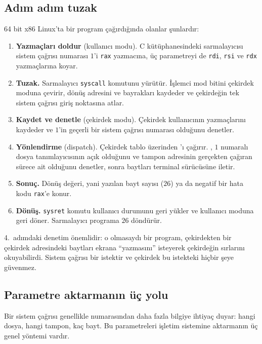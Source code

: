 \subsection{Adım adım tuzak}

64 bit x86 Linux'ta bir program  çağırdığında olanlar şunlardır:

\begin{enumerate}[leftmargin=1.4em]
  \item \textbf{Yazmaçları doldur} (kullanıcı modu). C kütüphanesindeki  sarmalayıcısı sistem çağrısı numarası $1$'i \texttt{rax} yazmacına, üç parametreyi de \texttt{rdi}, \texttt{rsi} ve \texttt{rdx} yazmaçlarına koyar.
  \item \textbf{Tuzak.} Sarmalayıcı \texttt{syscall} komutunu yürütür. İşlemci mod bitini çekirdek moduna çevirir, dönüş adresini ve bayrakları kaydeder ve çekirdeğin tek sistem çağrısı giriş noktasına atlar.
  \item \textbf{Kaydet ve denetle} (çekirdek modu). Çekirdek kullanıcının yazmaçlarını kaydeder ve $1$'in geçerli bir sistem çağrısı numarası olduğunu denetler.
  \item \textbf{Yönlendirme} (dispatch). Çekirdek tablo üzerinden 'ı çağırır. , $1$ numaralı dosya tanımlayıcısının açık olduğunu ve tampon adresinin gerçekten çağıran sürece ait olduğunu denetler, sonra baytları terminal sürücüsüne iletir.
  \item \textbf{Sonuç.} Dönüş değeri, yani yazılan bayt sayısı ($26$) ya da negatif bir hata kodu \texttt{rax}'e konur.
  \item \textbf{Dönüş.} \texttt{sysret} komutu kullanıcı durumunu geri yükler ve kullanıcı moduna geri döner. Sarmalayıcı programa $26$ döndürür.
\end{enumerate}

4.~adımdaki denetim önemlidir: o olmasaydı bir program, çekirdekten bir çekirdek adresindeki baytları ekrana ``yazmasını'' isteyerek çekirdeğin sırlarını okuyabilirdi. Sistem çağrısı bir istektir ve çekirdek bu istekteki hiçbir şeye güvenmez.

\subsection{Parametre aktarmanın üç yolu}

Bir sistem çağrısı genellikle numarasından daha fazla bilgiye ihtiyaç duyar: hangi dosya, hangi tampon, kaç bayt. Bu parametreleri işletim sistemine aktarmanın üç genel yöntemi vardır.

